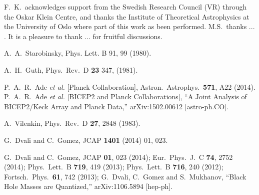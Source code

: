 \documentclass[aps, prd, preprint, superscriptaddress, tightenlines, nofootinbib]{revtex4}
\begin{document}
\noindent




\acknowledgements
\vspace{-4mm}F.~K.~acknowledges support from the Swedish Research Council (VR)
through the Oskar Klein Centre, and thanks the Institute of Theoretical Astrophysics at the University of Oslo where part of this work as been performed. M.S.~thanks ... . It is a pleasure to thank ... for fruitful discussions.


\begin{thebibliography}{99}

	A.~A.~Starobinsky,
	Phys. Lett. B 91, 99 (1980).

	A.~H.~Guth,
	Phys.~Rev.~D {\bf 23} 347, (1981).

	P.~A.~R.~Ade {\it et al.} [Planck Collaboration],
	Astron.~Astrophys.~{\bf 571}, A22 (2014).
	P.~A.~R.~Ade {\it et al.}  [BICEP2 and Planck Collaborations],
	``A Joint Analysis of BICEP2/Keck Array and Planck Data,''
	arXiv:1502.00612 [astro-ph.CO].

	A.~Vilenkin,
	Phys.~Rev.~D {\bf 27}, 2848 (1983).

	G.~Dvali and C.~Gomez,
	JCAP {\bf 1401} (2014) 01, 023.

	G.~Dvali and C.~Gomez,
	JCAP {\bf 01}, 023 (2014);
	Eur.~Phys.~J.~C {\bf 74}, 2752 (2014);
	Phys.~Lett.~B {\bf 719}, 419 (2013);
	Phys.~Lett.~B {\bf 716}, 240 (2012);
	Fortsch.~Phys.~{\bf 61}, 742 (2013);
	G.~Dvali, C.~Gomez and S.~Mukhanov,
	``Black Hole Masses are Quantized,''
	arXiv:1106.5894 [hep-ph].


\end{thebibliography}
\end{document}
